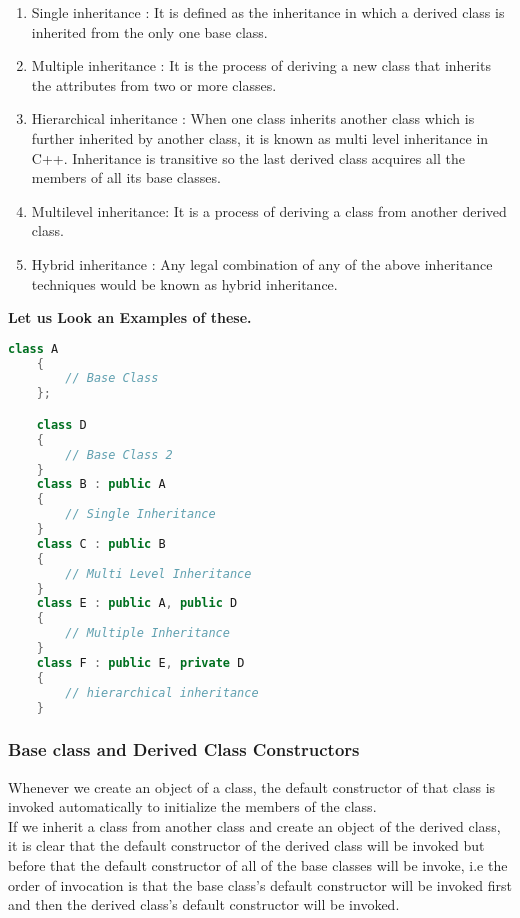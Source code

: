 \documentclass[11pt]{article}
\begin{document}
\begin{enumerate}
	\item Single inheritance :
	      It is defined as the inheritance in which a derived class is inherited from the only one base class.
	\item Multiple inheritance : It is the process of deriving a new class that inherits the attributes from two or more classes.
	\item Hierarchical inheritance : When one class inherits another class which is further inherited by another class, it is known as multi level inheritance in C++. Inheritance is transitive so the last derived class acquires all the members of all its base classes.
	\item Multilevel inheritance: It is a process of deriving a class from another derived class.
	\item Hybrid inheritance : Any legal combination of any of the above inheritance techniques would be known as hybrid inheritance.
\end{enumerate}

\textbf{Let us Look an Examples of these.}
\begin{lstlisting}[language = C++]
	class A
	{
		// Base Class
	};

	class D
	{
		// Base Class 2
	}
	class B : public A
	{
		// Single Inheritance
	}
	class C : public B
	{
		// Multi Level Inheritance
	}
	class E : public A, public D
	{
		// Multiple Inheritance
	}
	class F : public E, private D
	{
		// hierarchical inheritance
	}
\end{lstlisting}

\subsubsection{Base class and Derived Class Constructors}
Whenever we create an object of a class, the default constructor of that class is invoked automatically to initialize the members of the class. \\

If we inherit a class from another class and create an object of the derived class, it is clear that the default constructor of the derived class will be invoked but before that the default constructor of all of the base classes will be invoke, i.e the order of invocation is that the base class's default constructor will be invoked first and then the derived class's default constructor will be invoked.\\
\end{document}
